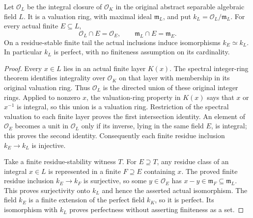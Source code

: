 \begin{lemma}
\label{fw:abstract-extension-residue-field}
\leanok
Let $\mathcal O_L$ be the integral closure of $\mathcal O_K$ in the
original abstract separable algebraic field $L$.
It is a valuation ring, with maximal ideal $\mathfrak m_L$, and put
$k_L=\mathcal O_L/\mathfrak m_L$.
For every actual finite $E\subseteq L$,
\[
 \mathcal O_L\cap E=\mathcal O_E,\qquad
 \mathfrak m_L\cap E=\mathfrak m_E.
\]
On a residue-stable finite tail the actual inclusions induce
isomorphisms $k_E\simeq k_L$. In particular $k_L$ is perfect, with no
finiteness assumption on its cardinality.
\end{lemma}
\begin{proof}
Every $x\in L$ lies in an actual finite layer $K(x)$.
The spectral integer-ring theorem identifies integrality over
$\mathcal O_K$ on that layer with membership in its original valuation
ring. Thus $\mathcal O_L$ is the directed union of these original
integer rings. Applied to nonzero $x$, the valuation-ring property in
$K(x)$ says that $x$ or $x^{-1}$ is integral, so this union is a
valuation ring. Restriction of the spectral valuation to each finite
layer proves the first intersection identity. An element of
$\mathcal O_E$ becomes a unit in $\mathcal O_L$ only if its inverse,
lying in the same field $E$, is integral; this proves the second identity.
Consequently each finite residue inclusion $k_E\to k_L$ is injective.

Take a finite residue-stability witness $T$. For $E\supseteq T$,
any residue class of an integral $x\in L$ is represented in a finite
$F\supseteq E$ containing $x$. The proved finite residue inclusion
$k_E\to k_F$ is surjective, so some $y\in\mathcal O_E$ has
$x-y\in\mathfrak m_F\subseteq\mathfrak m_L$.
This proves surjectivity onto $k_L$ and hence the asserted actual
isomorphism. The field $k_E$ is a finite extension of the perfect field
$k_K$, so it is perfect. Its isomorphism with $k_L$ proves perfectness
without asserting finiteness as a set.
\end{proof}

